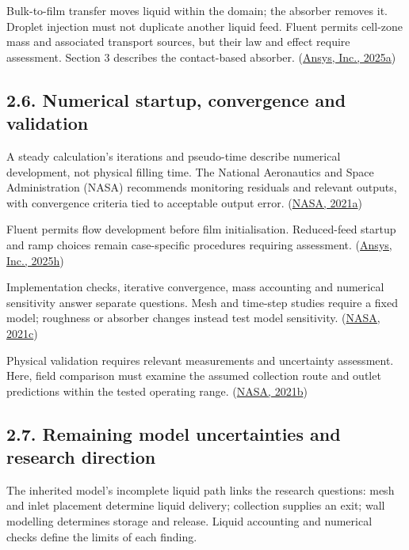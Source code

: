 \documentclass[
  12pt,
  a4paper,
]{article}
\begin{document}
Bulk-to-film transfer moves liquid within the domain; the absorber
removes it. Droplet injection must not duplicate another liquid feed.
Fluent permits cell-zone mass and associated transport sources, but
their law and effect require assessment. Section 3 describes the
contact-based absorber.
(\href{https://ansyshelp.ansys.com/public/Views/Secured/corp/v252/en/flu_ug/flu_ug_bcs_sec_cell_zones.html}{Ansys,
Inc., 2025a})

\subsection{2.6. Numerical startup, convergence and
validation}\label{numerical-startup-convergence-and-validation}

A steady calculation's iterations and pseudo-time describe numerical
development, not physical filling time. The National Aeronautics and
Space Administration (NASA) recommends monitoring residuals and relevant
outputs, with convergence criteria tied to acceptable output error.
(\href{https://www.grc.nasa.gov/www/wind/valid/tutorial/iterconv.html}{NASA,
2021a})

Fluent permits flow development before film initialisation. Reduced-feed
startup and ramp choices remain case-specific procedures requiring
assessment.
(\href{https://ansyshelp.ansys.com/public/views/secured/corp/v252/en/flu_ug/flu_ug_ewf_sec_overview.html}{Ansys,
Inc., 2025h})

Implementation checks, iterative convergence, mass accounting and
numerical sensitivity answer separate questions. Mesh and time-step
studies require a fixed model; roughness or absorber changes instead
test model sensitivity.
(\href{https://www.grc.nasa.gov/www/wind/valid/tutorial/verassess.html}{NASA,
2021c})

Physical validation requires relevant measurements and uncertainty
assessment. Here, field comparison must examine the assumed collection
route and outlet predictions within the tested operating range.
(\href{https://www.grc.nasa.gov/www/wind/valid/tutorial/valassess.html}{NASA,
2021b})

\subsection{2.7. Remaining model uncertainties and research
direction}\label{remaining-model-uncertainties-and-research-direction}

The inherited model's incomplete liquid path links the research
questions: mesh and inlet placement determine liquid delivery;
collection supplies an exit; wall modelling determines storage and
release. Liquid accounting and numerical checks define the limits of
each finding.
\end{document}
